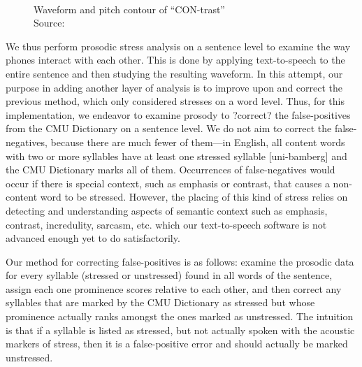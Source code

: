 \documentclass[pageno]{jpaper}
\newcommand{\quotes}[1]{``#1''}
\begin{document}
\begin{figure}
\\
\caption{Waveform \protect{} and pitch contour \protect{} of \quotes{CON-trast} \\ Source:}
\label{fig:contrast}
\end{figure}


We thus perform prosodic stress analysis on a sentence level to examine the way phones interact with each other. This is done by applying text-to-speech to the entire sentence and then studying the resulting waveform. In this attempt, our purpose in adding another layer of analysis is to improve upon and correct the previous method, which only considered stresses on a word level. Thus, for this implementation, we endeavor to examine prosody to ?correct? the false-positives from the CMU Dictionary on a sentence level. We do not aim to correct the false-negatives, because there are much fewer of them---in English, all content words with two or more syllables have at least one stressed syllable [uni-bamberg] and the CMU Dictionary marks all of them. Occurrences of false-negatives would occur if there is special context, such as emphasis or contrast, that causes a non-content word to be stressed. However, the placing of this kind of stress relies on detecting and understanding aspects of semantic context such as emphasis, contrast, incredulity, sarcasm, etc. which our text-to-speech software is not advanced enough yet to do satisfactorily.

Our method for correcting false-positives is as follows: examine the prosodic data for every syllable (stressed or unstressed) found in all words of the sentence, assign each one prominence scores relative to each other, and then correct any syllables that are marked by the CMU Dictionary as stressed but whose prominence actually ranks amongst the ones marked as unstressed. The intuition is that if a syllable is listed as stressed, but not actually spoken with the acoustic markers of stress, then it is a false-positive error and should actually be marked unstressed.
\end{document}
